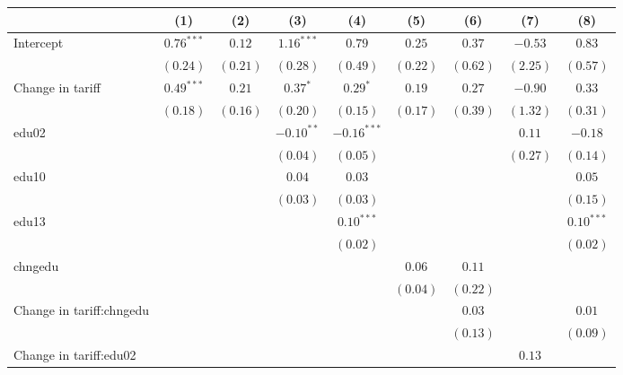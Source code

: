 
\begin{tabular}{l c c c c c c c c }
\hline
 & (1) & (2) & (3) & (4) & (5) & (6) & (7) & (8) \\
\hline
Intercept     & $0.76^{***}$ & $0.12$   & $1.16^{***}$ & $0.79$        & $0.25$   & $0.37$   & $-0.53$  & $0.83$       \\
                & $(0.24)$     & $(0.21)$ & $(0.28)$     & $(0.49)$      & $(0.22)$ & $(0.62)$ & $(2.25)$ & $(0.57)$     \\
Change in tariff         & $0.49^{***}$ & $0.21$   & $0.37^{*}$   & $0.29^{*}$    & $0.19$   & $0.27$   & $-0.90$  & $0.33$       \\
                & $(0.18)$     & $(0.16)$ & $(0.20)$     & $(0.15)$      & $(0.17)$ & $(0.39)$ & $(1.32)$ & $(0.31)$     \\
edu02           &              &          & $-0.10^{**}$ & $-0.16^{***}$ &          &          & $0.11$   & $-0.18$      \\
                &              &          & $(0.04)$     & $(0.05)$      &          &          & $(0.27)$ & $(0.14)$     \\
edu10           &              &          & $0.04$       & $0.03$        &          &          &          & $0.05$       \\
                &              &          & $(0.03)$     & $(0.03)$      &          &          &          & $(0.15)$     \\
edu13           &              &          &              & $0.10^{***}$  &          &          &          & $0.10^{***}$ \\
                &              &          &              & $(0.02)$      &          &          &          & $(0.02)$     \\
chngedu         &              &          &              &               & $0.06$   & $0.11$   &          &              \\
                &              &          &              &               & $(0.04)$ & $(0.22)$ &          &              \\
Change in tariff:chngedu &              &          &              &               &          & $0.03$   &          & $0.01$       \\
                &              &          &              &               &          & $(0.13)$ &          & $(0.09)$     \\
Change in tariff:edu02   &              &          &              &               &          &          & $0.13$   &              \\

\end{tabular}
